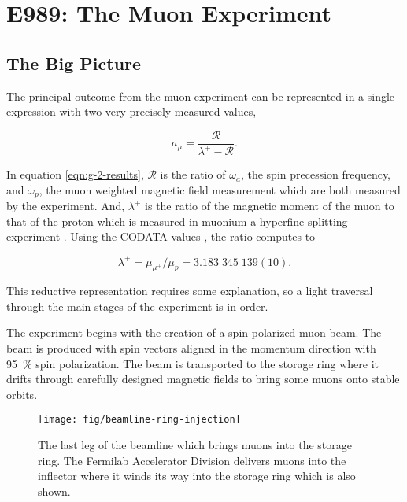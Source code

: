 \chapter {E989: The Muon \gmtwo Experiment}

\section{The Big Picture} \label{sec:expt-big-picture}

The principal outcome from the muon \gmtwo experiment can be represented in a single expression with two very precisely measured values,

\begin{equation}
\label{eqn:g-2-results}
a_\mu = \frac{\mathcal{R}}{\lambda^+ - \mathcal{R}}.
\end{equation}

\noindent 
In equation \ref{eqn:g-2-results}, $\mathcal{R}$ is the ratio of $\omega_a$, the spin precession frequency, and $\tilde{\omega}_p$, the muon weighted magnetic field measurement which are both measured by the experiment. And, $\lambda^+$ is the ratio of the magnetic moment of the muon to that of the proton which is measured in muonium a hyperfine splitting experiment \cite{muonium-hyperfine}.  Using the CODATA values \cite{codata}, the ratio computes to

\begin{equation}
\label{eqn:muon-to-proton-mu-ratio}
\lambda^+ = \mu_{\mu^+} / \mu_p = 3.183\;345\;139(10).
\end{equation}

\noindent
This reductive representation requires some explanation, so a light traversal through the main stages of the experiment is in order.

The experiment begins with the creation of a spin polarized muon beam.  The beam is produced with spin vectors aligned in the momentum direction with \SI{95}{\percent} spin polarization.  The beam is transported to the storage ring where it drifts through carefully designed magnetic fields to bring some muons onto stable orbits.

\begin{figure}
\label{fig:beamline-ring-injection}
\centering
\texttt{[image: fig/beamline-ring-injection]}
\caption{The last leg of the beamline which brings muons into the storage ring.  The Fermilab Accelerator Division delivers muons into the inflector where it winds its way into the storage ring which is also shown.}
\end{figure}

